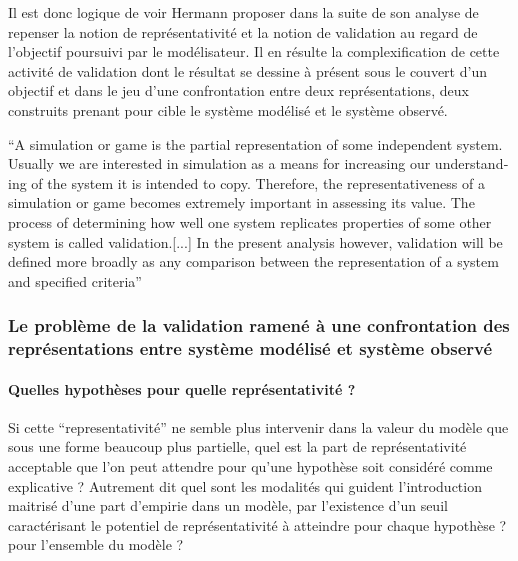 Il est donc logique de voir Hermann proposer dans la suite de son analyse de repenser la notion de représentativité et la notion de validation au regard de l'objectif poursuivi par le modélisateur. Il en résulte la complexification de cette activité de validation dont le résultat se dessine à présent sous le couvert d'un objectif et dans le jeu d'une confrontation entre deux représentations, deux construits prenant pour cible le système modélisé et le système observé. 

\foreignquote{english}{A simulation or game is the partial representation of some independent system. Usually we are interested in simulation as a means for increasing our understanding of the system it is intended to copy. Therefore, the representativeness of a simulation or game becomes extremely important in assessing its value. The process of determining how well one system replicates properties of some other system is called validation.[...] In the present analysis however, validation will be defined more broadly as any comparison between the representation of a system and specified criteria} \autocite[216]{Hermann1967}

\subsubsection{Le problème de la validation ramené à une confrontation des représentations entre système modélisé et système observé}
\label{ssec:confrontation_sysmodelise_sysobserve}


\paragraph{Quelles hypothèses pour quelle représentativité ?}
\label{p:hypothese_representativite}

Si cette \enquote{representativité} ne semble plus intervenir dans la valeur du modèle que sous une forme beaucoup plus partielle, quel est la part de représentativité acceptable que l'on peut attendre pour qu'une hypothèse soit considéré comme explicative ? Autrement dit quel sont les modalités qui guident l'introduction maitrisé d'une part d'empirie dans un modèle, par l'existence d'un seuil caractérisant le potentiel de représentativité à atteindre pour chaque hypothèse ? pour l'ensemble du modèle ? 

